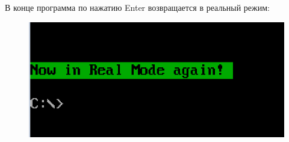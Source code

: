 В конце программа по нажатию Enter возвращается в реальный режим:

\begin{figure}[!h]
	\begin{center}
		\includegraphics[width=16cm]{inc/realmode.png}
	\end{center}
\end{figure}